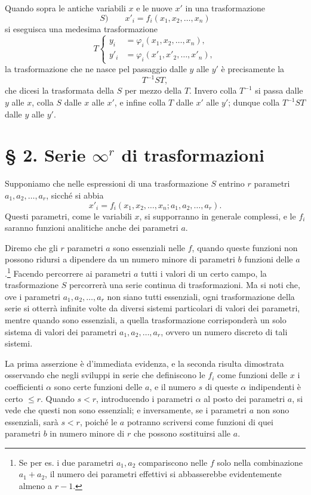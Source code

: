 \documentclass[11pt]{book}
\begin{document}
Quando sopra le antiche variabili $x$ e le nuove $x'$ in una trasformazione
\[
 S)\qquad x'_i=f_i(x_1,x_2,\ldots,x_n)
\]
si eseguisca una medesima trasformazione
\[
T\left\{
\begin{aligned}
 y_i&=\varphi_i(x_1,x_2,\ldots,x_n),\\
 y'_i&=\varphi_i(x'_1,x'_2,\ldots,x'_n),
\end{aligned}
\right.
\]
la trasformazione che ne nasce pel passaggio dalle $y$ alle $y'$ è precisamente la
\[
 T^{-1}ST,
\]
che dicesi la trasformata della $S$ per mezzo della $T$. Invero colla $T^{-1}$ si passa dalle $y$ alle $x$, colla $S$ dalle $x$ alle $x'$, e infine colla $T$ dalle $x'$ alle $y'$; dunque colla $T^{-1}ST$ dalle $y$ alle $y'$.

\section*{\S{} 2. Serie $\infty^r$ di trasformazioni}

Supponiamo che nelle espressioni di una trasformazione $S$ entrino $r$ parametri $a_1,a_2,\ldots,a_r$, sicché si abbia
\begin{equation*}\tag{3}
 x'_i=f_i(x_1,x_2,\ldots,x_n; a_1,a_2,\ldots,a_r).
\end{equation*}
Questi parametri, come le variabili $x$, si supporranno in generale complessi, e le $f_i$ saranno funzioni analitiche anche dei parametri $a$.

Diremo che gli $r$ parametri $a$ sono essenziali nelle $f$, quando queste funzioni non possono ridursi a dipendere da un numero minore di parametri $b$ funzioni delle $a$.\footnote{Se per es. i due parametri $a_1,a_2$ compariscono nelle $f$ solo nella combinazione $a_1+a_2$, il numero dei parametri effettivi si abbasserebbe evidentemente almeno a $r-1$.}
Facendo percorrere ai parametri $a$ tutti i valori di un certo campo, la trasformazione $S$ percorrerà una serie continua di trasformazioni. Ma si noti che, ove i parametri $a_1,a_2,\ldots,a_r$ non siano tutti essenziali, ogni trasformazione della serie si otterrà infinite volte da diversi sistemi particolari di valori dei parametri, mentre quando sono essenziali, a quella trasformazione corrisponderà un solo sistema di valori dei parametri $a_1,a_2,\ldots,a_r$, ovvero un numero discreto di tali sistemi.

La prima asserzione è d'immediata evidenza, e la seconda risulta dimostrata osservando che negli sviluppi in serie che definiscono le $f_i$ come funzioni delle $x$ i coefficienti $\alpha$ sono certe funzioni delle $a$, e il numero $s$ di queste $\alpha$ indipendenti è certo $\leq r$. Quando $s<r$, introducendo i parametri $\alpha$ al posto dei parametri $a$, si vede che questi non sono essenziali; e inversamente, se i parametri $a$ non sono essenziali, sarà $s<r$, poiché le $a$ potranno scriversi come funzioni di quei parametri $b$ in numero minore di $r$ che possono sostituirsi alle $a$.
\end{document}

